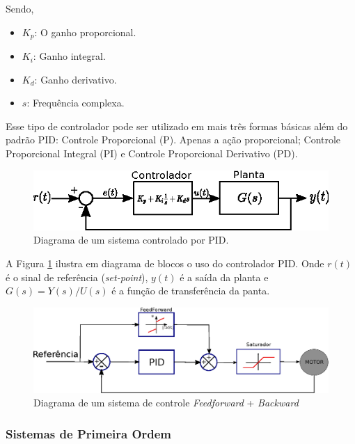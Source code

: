Sendo,

\begin{itemize}
    \item $K_p$: O ganho proporcional.
    \item $K_i$: Ganho integral.
    \item $K_d$: Ganho derivativo.
    \item $s$: Frequência complexa.
\end{itemize}

Esse tipo de controlador pode ser utilizado em mais três formas básicas além do padrão PID: Controle Proporcional (P). Apenas a ação proporcional; Controle Proporcional Integral (PI) e Controle Proporcional Derivativo (PD).

\begin{figure}[H]
    \centering
    \includegraphics[width=\textwidth]{imagens/ilustracoes/diagrama_controlador_PID.eps}
    \caption{Diagrama de um sistema controlado por PID.}
    \label{fig:diagrama_controlador_PID}
\end{figure}

A Figura \ref{fig:diagrama_controlador_PID} ilustra em diagrama de blocos o uso do controlador PID. Onde $r(t)$ é o sinal de referência (\emph{set-point}), $y(t)$ é a saída da planta e $G(s) = Y(s)/U(s)$ é a função de transferência da panta.

\begin{figure}[H]
    \centering
    \includegraphics[width=\textwidth]{imagens/ilustracoes/sistema_de_controle_completo.eps}
    \caption{Diagrama de um sistema de controle \textit{Feedforward} + \textit{Backward}}
    \label{fig:diagrama_sistema_de_controle_feedforward_backward}
\end{figure}

\subsubsection{Sistemas de Primeira Ordem}

